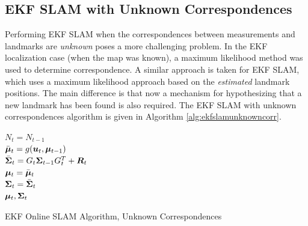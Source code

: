 \subsection{EKF SLAM with Unknown Correspondences}
Performing EKF SLAM when the correspondences between measurements and landmarks are \textit{unknown} poses a more challenging problem. In the EKF localization case (when the map was known), a maximum likelihood method was used to determine correspondence. A similar approach is taken for EKF SLAM, which uses a maximum likelihood approach based on the \textit{estimated} landmark positions. The main difference is that now a mechanism for hypothesizing that a new landmark has been found is also required. The EKF SLAM with unknown correspondences algorithm is given in Algorithm \ref{alg:ekfslamunknowncorr}.
\begin{algorithm}[ht]
 $N_t = N_{t-1}$\\
 $\bar{\bm{\mu}}_t = g(\bm{u}_t,\bm{\mu}_{t-1})$\\
 $\bar{\bm{\Sigma}}_t = G_t\bm{\Sigma}_{t-1} G_t^{T} + \bm{R}_t$\\
 $\bm{\mu}_t = \bar{\bm{\mu}}_t$\\
 $\bm{\Sigma}_t = \bar{\bm{\Sigma}}_t$\\
 \Return $\bm{\mu}_t, \bm{\Sigma}_t$
 \caption{EKF Online SLAM Algorithm, Unknown Correspondences}
 \label{alg:ekfslamunknowncorr}
\end{algorithm}

